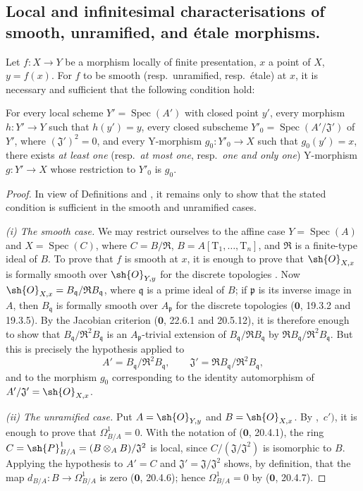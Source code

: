\subsection{Local and infinitesimal characterisations of smooth, unramified, and \'etale morphisms.}
\label{subsection:IV.17.14}
\begin{proposition}[17.14.1]
\label{IV.17.14.1}
Let $f:X\to Y$ be a morphism locally of finite presentation, $x$ a point of $X$, $y=f(x)$.
For $f$ to be smooth (resp.\ unramified, resp.\ \'etale) at $x$, it is necessary and sufficient that the following condition hold:

For every local scheme $Y'=\operatorname{Spec}(A')$ with closed point $y'$, every morphism $h:Y'\to Y$ such that $h(y')=y$, every closed subscheme $Y'_0=\operatorname{Spec}(A'/\mathfrak J')$ of $Y'$, where $(\mathfrak J')^2=0$, and every Y-morphism $g_0:Y'_0\to X$ such that $g_0(y')=x$, there exists \emph{at least one} (resp.\ \emph{at most one}, resp.\ \emph{one and only one}) Y-morphism $g:Y'\to X$ whose restriction to $Y'_0$ is $g_0$.
\end{proposition}

\begin{proof}
In view of Definitions  and , it remains only to show that the stated condition is sufficient in the smooth and unramified cases.

\emph{(i) The smooth case.}
We may restrict ourselves to the affine case $Y=\operatorname{Spec}(A)$ and $X=\operatorname{Spec}(C)$, where
$C=B/\mathfrak R$, $B=A[\mathrm{T}_1,\ldots,\mathrm{T}_n]$, and $\mathfrak R$ is a finite-type ideal of $B$.
To prove that $f$ is smooth at $x$, it is enough to prove that $\sh{O}_{X,x}$ is formally smooth over $\sh{O}_{Y,y}$ for the discrete topologies .
Now $\sh{O}_{X,x}=B_{\mathfrak q}/\mathfrak RB_{\mathfrak q}$, where $\mathfrak q$ is a prime ideal of $B$; if $\mathfrak p$ is its inverse image in $A$, then $B_{\mathfrak q}$ is formally smooth over $A_{\mathfrak p}$ for the discrete topologies ($\mathbf{0}$, 19.3.2 and 19.3.5).
By the Jacobian criterion ($\mathbf{0}$, 22.6.1 and 20.5.12), it is therefore enough to show that
$B_{\mathfrak q}/\mathfrak R^2B_{\mathfrak q}$ is an $A_{\mathfrak p}$-trivial extension of
$B_{\mathfrak q}/\mathfrak RB_{\mathfrak q}$ by
$\mathfrak RB_{\mathfrak q}/\mathfrak R^2B_{\mathfrak q}$.
But this is precisely the hypothesis applied to
\[
 A'=B_{\mathfrak q}/\mathfrak R^2B_{\mathfrak q},\qquad
 \mathfrak J'=\mathfrak RB_{\mathfrak q}/\mathfrak R^2B_{\mathfrak q},
\]
and to the morphism $g_0$ corresponding to the identity automorphism of
$A'/\mathfrak J'=\sh{O}_{X,x}$.

\emph{(ii) The unramified case.}
Put $A=\sh{O}_{Y,y}$ and $B=\sh{O}_{X,x}$.
By ,~$c')$, it is enough to prove that $\Omega^1_{B/A}=0$.
With the notation of ($\mathbf{0}$, 20.4.1), the ring
$C=\sh{P}^1_{B/A}=(B\otimes_AB)/\mathfrak J^2$ is local, since
$C/(\mathfrak J/\mathfrak J^2)$ is isomorphic to $B$.
Applying the hypothesis to $A'=C$ and $\mathfrak J'=\mathfrak J/\mathfrak J^2$ shows, by definition, that the map
$d_{B/A}:B\to\Omega^1_{B/A}$ is zero ($\mathbf{0}$, 20.4.6); hence $\Omega^1_{B/A}=0$ by ($\mathbf{0}$, 20.4.7).
\end{proof}

